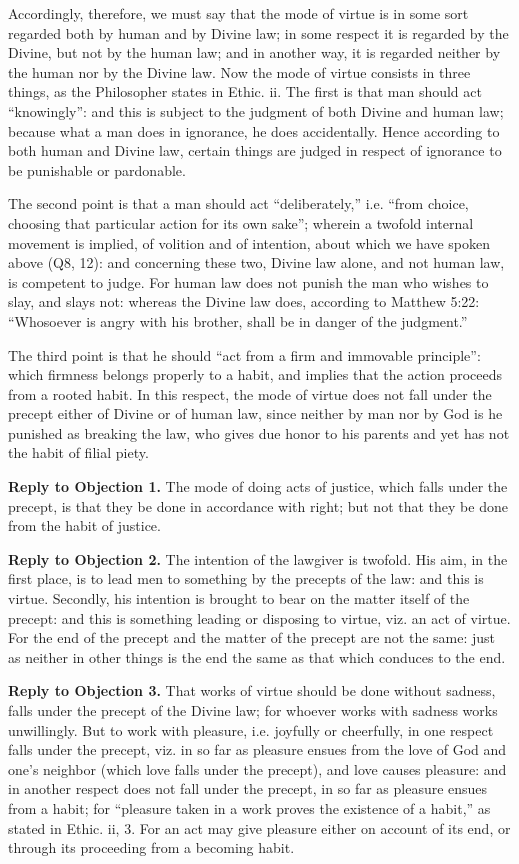 Accordingly, therefore, we must say that the mode of virtue is in some sort regarded both by human and by Divine law; in some respect it is regarded by the Divine, but not by the human law; and in another way, it is regarded neither by the human nor by the Divine law. Now the mode of virtue consists in three things, as the Philosopher states in Ethic. ii. The first is that man should act ``knowingly'': and this is subject to the judgment of both Divine and human law; because what a man does in ignorance, he does accidentally. Hence according to both human and Divine law, certain things are judged in respect of ignorance to be punishable or pardonable.

The second point is that a man should act ``deliberately,'' i.e. ``from choice, choosing that particular action for its own sake''; wherein a twofold internal movement is implied, of volition and of intention, about which we have spoken above (Q8, 12): and concerning these two, Divine law alone, and not human law, is competent to judge. For human law does not punish the man who wishes to slay, and slays not: whereas the Divine law does, according to Matthew 5:22: ``Whosoever is angry with his brother, shall be in danger of the judgment.''

The third point is that he should ``act from a firm and immovable principle'': which firmness belongs properly to a habit, and implies that the action proceeds from a rooted habit. In this respect, the mode of virtue does not fall under the precept either of Divine or of human law, since neither by man nor by God is he punished as breaking the law, who gives due honor to his parents and yet has not the habit of filial piety.

\textbf{Reply to Objection 1.} The mode of doing acts of justice, which falls under the precept, is that they be done in accordance with right; but not that they be done from the habit of justice.

\textbf{Reply to Objection 2.} The intention of the lawgiver is twofold. His aim, in the first place, is to lead men to something by the precepts of the law: and this is virtue. Secondly, his intention is brought to bear on the matter itself of the precept: and this is something leading or disposing to virtue, viz. an act of virtue. For the end of the precept and the matter of the precept are not the same: just as neither in other things is the end the same as that which conduces to the end.

\textbf{Reply to Objection 3.} That works of virtue should be done without sadness, falls under the precept of the Divine law; for whoever works with sadness works unwillingly. But to work with pleasure, i.e. joyfully or cheerfully, in one respect falls under the precept, viz. in so far as pleasure ensues from the love of God and one's neighbor (which love falls under the precept), and love causes pleasure: and in another respect does not fall under the precept, in so far as pleasure ensues from a habit; for ``pleasure taken in a work proves the existence of a habit,'' as stated in Ethic. ii, 3. For an act may give pleasure either on account of its end, or through its proceeding from a becoming habit.

